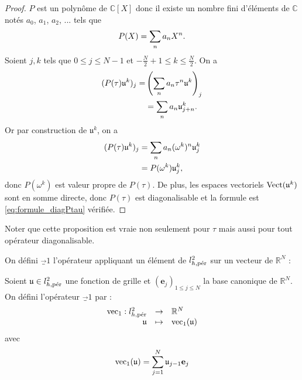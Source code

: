 \begin{proof}
$P$ est un polynôme de $\mathbb{C}[X]$ donc il existe un nombre fini d'éléments de $\mathbb{C}$ notés $a_0$, $a_1$, $a_2$, ... tels que
\begin{equation}
P(X) = \gsum_{n} a_n X^n.
\end{equation}
Soient $j, k$ tels que $0 \leq j \leq N-1$ et $-\frac{N}{2}+1 \leq k \leq \frac{N}{2}$. On a
\begin{align*}
(P(\tau)\mathfrak{u}^k)_j = & \left( \gsum_{n} a_n \tau^n \mathfrak{u}^k  \right)_j\\
	& = \gsum_n a_n \mathfrak{u}^k_{j+n}.
	\end{align*}
Or par construction de $\mathfrak{u}^k$, on a
\begin{align*}	
(P(\tau)\mathfrak{u}^k)_j & = \gsum_{n} a_n (\omega^k)^n \mathfrak{u}_j^k \\
	& = P(\omega^k) \mathfrak{u}_j^k,
\end{align*}
donc $P(\omega^k)$ est valeur propre de $P(\tau)$.
De plus, les espaces vectoriels $\Vect (\mathfrak{u}^k)$ sont en somme directe, donc $P(\tau)$ est diagonalisable et la formule  est \eqref{eq:formule_diagPtau} vérifiée.
\end{proof}

\begin{remarque}
Noter que cette proposition est vraie non seulement pour $\tau$ mais aussi pour tout opérateur diagonalisable.
\end{remarque}

On défini $\vec_1$ l'opérateur appliquant un élément de $l_{h,\per}^2$ sur un vecteur de $\mathbb{R}^N$ :

\begin{definition}
Soient $\mathfrak{u} \in l^2_{h,\per}$ une fonction de grille et $(\mathbf{e}_j)_{1 \leq j \leq N}$ la base canonique de $\mathbb{R}^N$. On défini l'opérateur $\vec_1$ par :
\begin{equation}
\begin{array}{rcl}
\vec_1 : l^2_{h,\per} & \rightarrow & \mathbb{R}^N \\
         \mathfrak{u} & \mapsto & \vec_1 ( \mathfrak{u} )
\end{array}
\end{equation}
avec 
\begin{equation}
\vec_1 (\mathfrak{u} ) = \gsum_{j=1}^N \mathfrak{u}_{j-1} \mathbf{e}_j
\end{equation}
\end{definition}


